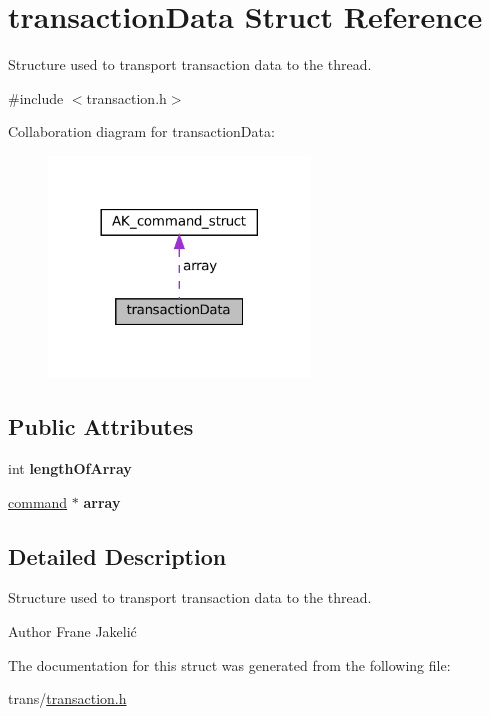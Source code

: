 \hypertarget{structtransactionData}{}\section{transaction\+Data Struct Reference}
\label{structtransactionData}


Structure used to transport transaction data to the thread.  




{\ttfamily \#include $<$transaction.\+h$>$}



Collaboration diagram for transaction\+Data\+:\nopagebreak
\begin{figure}[H]
\begin{center}
\leavevmode
\includegraphics[width=197pt]{structtransactionData__coll__graph}
\end{center}
\end{figure}
\subsection*{Public Attributes}
\begin{DoxyCompactItemize}
\item 
\mbox{\label{structtransactionData_a07852cb012632b34732db8b4758e95af}} 
int {\bfseries length\+Of\+Array}
\item 
\mbox{\label{structtransactionData_a131a5758b32a415a0c056c7496ca4ee8}} 
\hyperlink{structAK__command__struct}{command} $\ast$ {\bfseries array}
\end{DoxyCompactItemize}


\subsection{Detailed Description}
Structure used to transport transaction data to the thread. 

\begin{DoxyAuthor}{Author}
Frane Jakelić 
\end{DoxyAuthor}


The documentation for this struct was generated from the following file\+:\begin{DoxyCompactItemize}
\item 
trans/\hyperlink{transaction_8h}{transaction.\+h}\end{DoxyCompactItemize}
